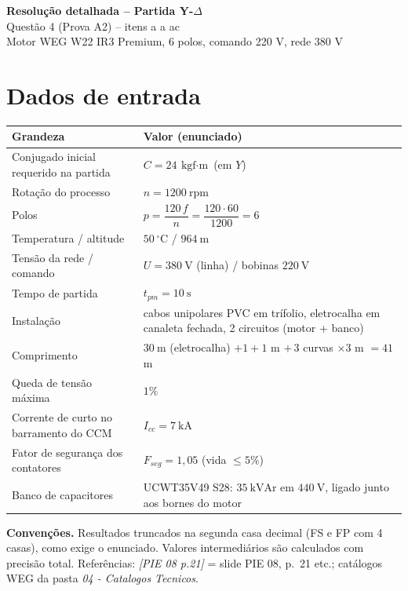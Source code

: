 \documentclass[11pt,a4paper]{article}
\newcommand{\src}[1]{\textit{[#1]}}
\begin{document}
\begin{center}
{\LARGE\bfseries Resolu\c{c}\~ao detalhada -- Partida Y-$\Delta$}\\[4pt]
{\large Quest\~ao 4 (Prova A2) -- itens a a ac}\\[2pt]
{\normalsize Motor WEG W22 IR3 Premium, 6 polos, comando 220 V, rede 380 V}
\end{center}

\section{Dados de entrada}

\begin{tabularx}{\linewidth}{@{}lX@{}}
\toprule
Grandeza & Valor (enunciado) \\
\midrule
Conjugado inicial requerido na partida & $C = 24\ \text{kgf$\cdot$m}$ (em $Y$) \\
Rota\c{c}\~ao do processo & $n = 1200\ \text{rpm}$ \\
Polos & $p = \dfrac{120\,f}{n} = \dfrac{120\cdot 60}{1200} = 6$ \\
Temperatura / altitude & $50\,^{\circ}\text{C}$ / $964\ \text{m}$ \\
Tens\~ao da rede / comando & $U = 380\ \text{V}$ (linha) / bobinas $220\ \text{V}$ \\
Tempo de partida & $t_{pm} = 10\ \text{s}$ \\
Instala\c{c}\~ao & cabos unipolares PVC em tr\'ifolio, eletrocalha em canaleta fechada, 2 circuitos (motor + banco) \\
Comprimento & $30\ \text{m}$ (eletrocalha) $+1+1$ m $+\,3$ curvas $\times 3$ m $=41$ m \\
Queda de tens\~ao m\'axima & $1\%$ \\
Corrente de curto no barramento do CCM & $I_{cc}=7\ \text{kA}$ \\
Fator de seguran\c{c}a dos contatores & $F_{seg}=1{,}05$ (vida $\le 5\%$) \\
Banco de capacitores & UCWT35V49 S28: $35\ \text{kVAr}$ em $440\ \text{V}$, ligado junto aos bornes do motor \\
\bottomrule
\end{tabularx}

\medskip
\textbf{Conven\c{c}\~oes.} Resultados truncados na segunda casa decimal (FS e FP com 4 casas), como exige o enunciado. Valores intermedi\'arios s\~ao calculados com precis\~ao total. Refer\^encias: \src{PIE 08 p.21} = slide PIE 08, p.~21 etc.; cat\'alogos WEG da pasta \emph{04 - Catalogos Tecnicos}.
\end{document}
